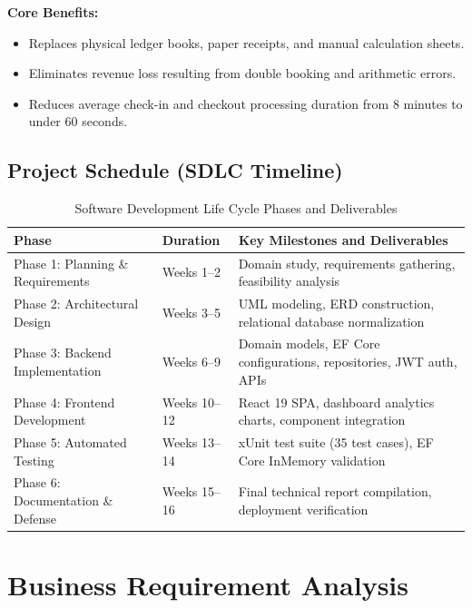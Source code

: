 \documentclass[11pt,a4paper]{article}
\begin{document}
\noindent \textbf{Core Benefits:}
\begin{itemize}[leftmargin=*]
  \item Replaces physical ledger books, paper receipts, and manual calculation sheets.
  \item Eliminates revenue loss resulting from double booking and arithmetic errors.
  \item Reduces average check-in and checkout processing duration from 8 minutes to under 60 seconds.
\end{itemize}

\subsection{Project Schedule (SDLC Timeline)}
\begin{table}[H]
\centering
\caption{Software Development Life Cycle Phases and Deliverables}
\label{tab:gantt_table}
\begin{tabularx}{\textwidth}{l l X}
\toprule
\textbf{Phase} & \textbf{Duration} & \textbf{Key Milestones and Deliverables} \\
\midrule
Phase 1: Planning \& Requirements & Weeks 1--2 & Domain study, requirements gathering, feasibility analysis \\
Phase 2: Architectural Design & Weeks 3--5 & UML modeling, ERD construction, relational database normalization \\
Phase 3: Backend Implementation & Weeks 6--9 & Domain models, EF Core configurations, repositories, JWT auth, APIs \\
Phase 4: Frontend Development & Weeks 10--12 & React 19 SPA, dashboard analytics charts, component integration \\
Phase 5: Automated Testing & Weeks 13--14 & xUnit test suite (35 test cases), EF Core InMemory validation \\
Phase 6: Documentation \& Defense & Weeks 15--16 & Final technical report compilation, deployment verification \\
\bottomrule
\end{tabularx}
\end{table}

\section{Business Requirement Analysis}
\end{document}
